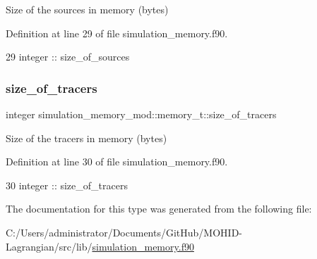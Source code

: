 Size of the sources in memory (bytes) 



Definition at line 29 of file simulation\+\_\+memory.\+f90.


\begin{DoxyCode}
29         \textcolor{keywordtype}{integer} :: size\_of\_sources
\end{DoxyCode}
\mbox{\label{structsimulation__memory__mod_1_1memory__t_a7b1960036177b6612be260699fcdb19a}} 
\subsubsection{\texorpdfstring{size\+\_\+of\+\_\+tracers}{size\_of\_tracers}}
{\footnotesize\ttfamily integer simulation\+\_\+memory\+\_\+mod\+::memory\+\_\+t\+::size\+\_\+of\+\_\+tracers\hspace{0.3cm}{\ttfamily [private]}}



Size of the tracers in memory (bytes) 



Definition at line 30 of file simulation\+\_\+memory.\+f90.


\begin{DoxyCode}
30         \textcolor{keywordtype}{integer} :: size\_of\_tracers
\end{DoxyCode}


The documentation for this type was generated from the following file\+:\begin{DoxyCompactItemize}
\item 
C\+:/\+Users/administrator/\+Documents/\+Git\+Hub/\+M\+O\+H\+I\+D-\/\+Lagrangian/src/lib/\mbox{\hyperlink{simulation__memory_8f90}{simulation\+\_\+memory.\+f90}}\end{DoxyCompactItemize}
